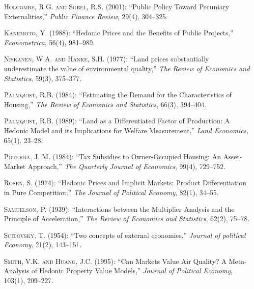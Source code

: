 \documentclass[ecta,nameyear,draft]{econsocart}
\theoremstyle{plain}
\theoremstyle{remark}
\begin{document}
\begin{thebibliography}{}
\textsc{Holcombe, R.G. and Sobel, R.S.} (2001):
``Public Policy Toward Pecuniary Externalities,''
\textit{Public Finance Review}, 29(4), 304--325.
\endbibitem

\textsc{Kanemoto, Y.} (1988):
``Hedonic Prices and the Benefits of Public Projects,''
\textit{Econometrica}, 56(4), 981--989.
\endbibitem



\textsc{Niskanen, W.A. and Hanke, S.H.} (1977):
``Land prices substantially underestimate the value of environmental quality,''
\textit{The Review of Economics and Statistics}, 59(3), 375--377.
\endbibitem

\textsc{Palmquist, R.B.} (1984):
``Estimating the Demand for the Characteristics of Housing,''
\textit{The Review of Economics and Statistics}, 66(3), 394--404.
\endbibitem


\textsc{Palmquist, R.B.} (1989):
``Land as a Differentiated Factor of Production: A Hedonic Model and its Implications for Welfare Measurement,''
\textit{Land Economics}, 65(1), 23--28.
\endbibitem

\textsc{Poterba, J. M.} (1984):
``Tax Subsidies to Owner-Occupied Housing: An Asset-Market Approach,''
\textit{The Quarterly Journal of Economics}, 99(4), 729--752.
\endbibitem

\textsc{Rosen, S.} (1974):
``Hedonic Prices and Implicit Markets: Product Differentiation in Pure Competition,''
\textit{The Journal of Political Economy}, 82(1), 34--55.
\endbibitem

\textsc{Samuelson, P.} (1939):
``Interactions between the Multiplier Analysis and the Principle of Acceleration,''
\textit{The Review of Economics and Statistics}, 62(2), 75--78.
\endbibitem

\textsc{Scitovsky, T.} (1954):
``Two concepts of external economies,''
\textit{Journal of political Economy}, 21(2), 143--151.
\endbibitem


\textsc{Smith, V.K. and Huang, J.C.} (1995):
``Can Markets Value Air Quality? A Meta-Analysis of Hedonic Property Value Models,''
\textit{Journal of Political Economy}, 103(1), 209--227.
\endbibitem



\end{thebibliography}
\end{document}
